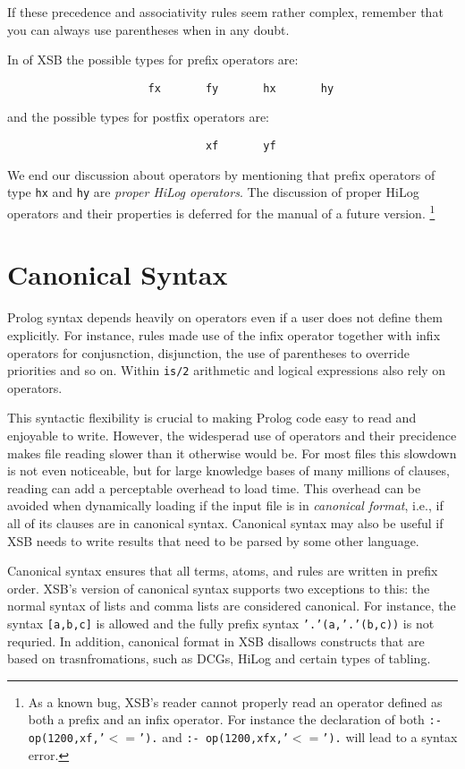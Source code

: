 If these precedence and associativity rules seem rather complex, remember
that you can always use parentheses when in any doubt.

In \version{} of XSB the possible types for prefix operators are:
\begin{verbatim}
                      fx       fy       hx       hy
\end{verbatim}
and the possible types for postfix operators are:
\begin{verbatim}
                               xf       yf
\end{verbatim}

We end our discussion about operators by mentioning that prefix
operators of type {\tt hx} and {\tt hy} are {\em proper HiLog
  operators}.  The discussion of proper HiLog operators and their
properties is deferred for the manual of a future version.
\footnote{As a known bug, XSB's reader cannot properly read an
  operator defined as both a prefix and an infix operator.  For
  instance the declaration of both {\tt :- op(1200,xf,'$<=$').} and 
{\tt :- op(1200,xfx,'$<=$').} will lead to a syntax error.}

\section{Canonical Syntax} \label{sec:canonical}
%
Prolog syntax depends heavily on operators even if a user does not
define them explicitly.  For instance, rules made use of the infix
\mif{} operator together with infix operators for conjusnction,
disjunction, the use of parentheses to override priorities and so on.
Within {\tt is/2} arithmetic and logical expressions also rely on
operators.  

This syntactic flexibility is crucial to making Prolog code easy to
read and enjoyable to write.  However, the widesperad use of operators
and their precidence makes file reading slower than it otherwise would
be.  For most files this slowdown is not even noticeable, but for
large knowledge bases of many millions of clauses, reading can add a
perceptable overhead to load time.  This overhead can be avoided when
dynamically loading if the input file is in {\em canonical format},
i.e., if all of its clauses are in canonical syntax.  Canonical syntax
may also be useful if XSB needs to write results that need to be
parsed by some other language.

Canonical syntax ensures that all terms, atoms, and rules are written
in prefix order.  XSB's version of canonical syntax supports two
exceptions to this: the normal syntax of lists and comma lists are
considered canonical.  For instance, the syntax {\tt [a,b,c]} is
allowed and the fully prefix syntax {\tt '.'(a,'.'(b,c))} is not
requried.  In addition, canonical format in XSB disallows constructs
that are based on trasnfromations, such as DCGs, HiLog and certain
types of tabling.

